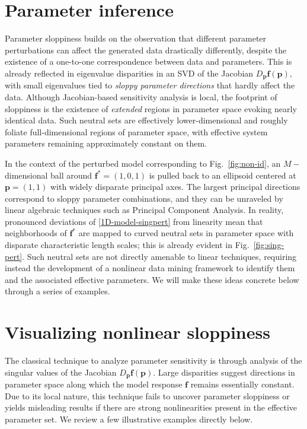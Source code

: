 \section{Parameter inference}

Parameter sloppiness builds on the observation that different
parameter perturbations can affect the generated data drastically
differently, despite the existence of a one-to-one correspondence
between data and parameters.  This is already reflected in eigenvalue
disparities in an SVD of the Jacobian
$D_\mathbf{p}\mathbf{f}(\mathbf{p})$, with small eigenvalues tied to
\emph{sloppy parameter directions} that hardly affect the data.
Although Jacobian-based sensitivity analysis is local, the footprint
of sloppiness is the existence of \emph{extended} regions in parameter
space evoking nearly identical data.  Such neutral sets are
effectively lower-dimensional and roughly foliate full-dimensional
regions of parameter space, with effective system parameters remaining
approximately constant on them.


In the context of the perturbed model corresponding to
Fig.~\ref{fig:non-id}, an $M-$dimensional ball around
$\mathbf{f}^*=(1,0,1)$ is pulled back to an ellipsoid centered at
$\mathbf{p} = (1,1)$ with widely disparate principal axes.  The
largest principal directions correspond to sloppy parameter
combinations, and they can be unraveled by linear algebraic techniques
such as Principal Component Analysis.  In reality, pronounced
deviations of \eqref{1D-model-singpert} from linearity mean that
neighborhoods of $\mathbf{f}^*$ are mapped to curved neutral sets in
parameter space with disparate characteristic length scales; this is
already evident in Fig.~\ref{fig:sing-pert}.  Such neutral sets are
not directly amenable to linear techniques, requiring instead the
development of a nonlinear data mining framework to identify them and
the associated effective parameters.  We will make these ideas
concrete below through a series of examples.

\section{Visualizing nonlinear sloppiness}
The classical technique to analyze parameter sensitivity is through
analysis of the singular values of the Jacobian
$D_\mathbf{p}\mathbf{f}(\mathbf{p})$.  Large disparities suggest
directions in parameter space along which the model response
$\mathbf{f}$ remains essentially constant.  Due to its local nature,
this technique fails to uncover parameter sloppiness or yields
misleading results if there are strong nonlinearities present in the
effective parameter set. We review a few illustrative examples
directly below.

